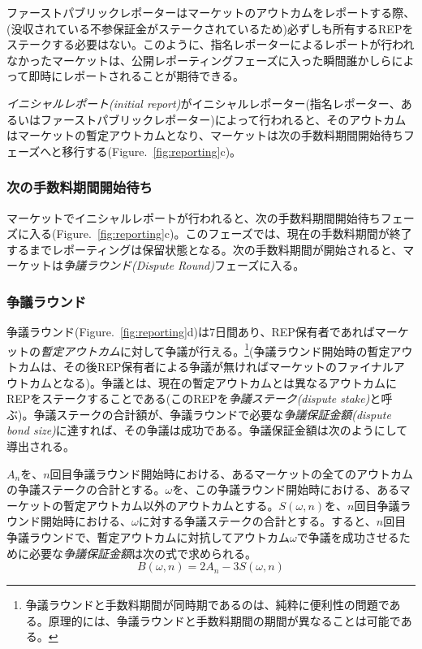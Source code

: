 \documentclass[floatfix,reprint,nofootinbib,amsmath,amssymb,epsfig,pre,floats,letterpaper,groupedaffiliation]{revtex4-1}
\newcommand{\beq}{\begin{equation}}
\newcommand{\eeq}{\end{equation}}
\theoremstyle{definition}
\theoremstyle{definition}
\theoremstyle{definition}
\begin{document}
ファーストパブリックレポーターはマーケットのアウトカムをレポートする際、(没収されている不参保証金がステークされているため)必ずしも所有するREPをステークする必要はない。このように、指名レポーターによるレポートが行われなかったマーケットは、公開レポーティングフェーズに入った瞬間誰かしらによって即時にレポートされることが期待できる。

\textit{イニシャルレポート(initial report)}がイニシャルレポーター(指名レポーター、あるいはファーストパブリックレポーター)によって行われると、そのアウトカムはマーケットの暫定アウトカムとなり、マーケットは次の手数料期間開始待ちフェーズへと移行する(Figure.~\ref{fig:reporting}c)。

\subsubsection{次の手数料期間開始待ち}

マーケットでイニシャルレポートが行われると、次の手数料期間開始待ちフェーズに入る(Figure.~\ref{fig:reporting}c)。このフェーズでは、現在の手数料期間が終了するまでレポーティングは保留状態となる。次の手数料期間が開始されると、マーケットは\textit{争議ラウンド(Dispute Round)}フェーズに入る。

\subsubsection{争議ラウンド}

争議ラウンド(Figure.~\ref{fig:reporting}d)は7日間あり、REP保有者であればマーケットの\textit{暫定アウトカム}に対して争議が行える。\footnote{争議ラウンドと手数料期間が同時期であるのは、純粋に便利性の問題である。原理的には、争議ラウンドと手数料期間の期間が異なることは可能である。}(争議ラウンド開始時の暫定アウトカムは、その後REP保有者による争議が無ければマーケットのファイナルアウトカムとなる)。争議とは、現在の暫定アウトカムとは異なるアウトカムにREPをステークすることである(このREPを\textit{争議ステーク(dispute stake)}と呼ぶ)。争議ステークの合計額が、争議ラウンドで必要な\textit{争議保証金額(dispute bond size)}に達すれば、その争議は成功である。争議保証金額は次のようにして導出される。

$A_n$を、$n$回目争議ラウンド開始時における、あるマーケットの全てのアウトカムの争議ステークの合計とする。$\omega$を、この争議ラウンド開始時における、あるマーケットの暫定アウトカム以外のアウトカムとする。$S(\omega, n)$を、$n$回目争議ラウンド開始時における、$\omega$に対する争議ステークの合計とする。すると、$n$回目争議ラウンドで、暫定アウトカムに対抗してアウトカム$\omega$で争議を成功させるために必要な\textit{争議保証金額}は次の式で求められる。
\beq \label{eq:bond_size}
B(\omega, n) = 2A_n - 3S(\omega, n)
\eeq
\end{document}
